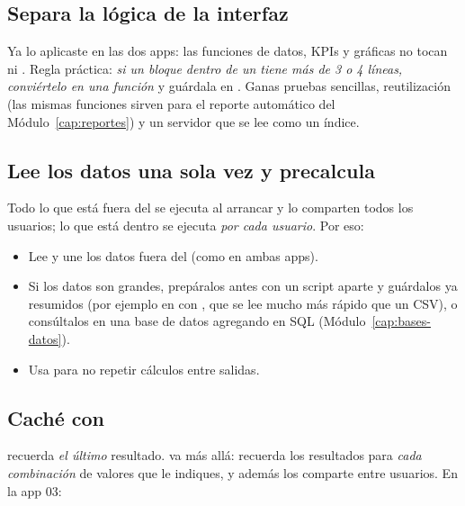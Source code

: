 \subsection{Separa la lógica de la interfaz}

Ya lo aplicaste en las dos apps: las funciones de datos, KPIs y gráficas no
tocan  ni . Regla práctica: \emph{si un bloque
dentro de un  tiene más de 3 o 4 líneas, conviértelo en
una función} y guárdala en . Ganas pruebas sencillas,
reutilización (las mismas funciones sirven para el reporte automático del
Módulo~\ref{cap:reportes}) y un servidor que se lee como un índice.

\subsection{Lee los datos una sola vez y precalcula}

Todo lo que está fuera del  se ejecuta al arrancar y lo
comparten todos los usuarios; lo que está dentro se ejecuta \emph{por cada
usuario}. Por eso:

\begin{itemize}
  \item Lee y une los datos fuera del  (como en ambas apps).
  \item Si los datos son grandes, prepáralos antes con un script aparte y
        guárdalos ya resumidos (por ejemplo en  con
        , que se lee mucho más rápido que un CSV), o
        consúltalos en una base de datos agregando en SQL
        (Módulo~\ref{cap:bases-datos}).
  \item Usa  para no repetir cálculos entre salidas.
\end{itemize}

\subsection{Caché con \texorpdfstring{}{bindCache()}}

 recuerda \emph{el último} resultado. 
va más allá: recuerda los resultados para \emph{cada combinación} de valores
que le indiques, y además los comparte entre usuarios. En la app 03:


